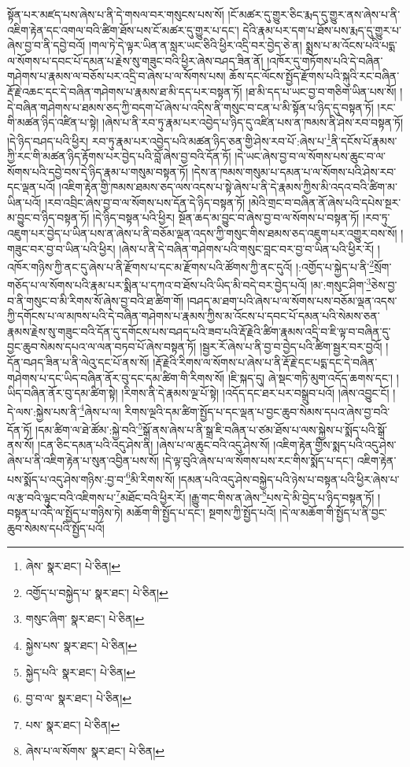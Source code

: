 སྟོན་པར་མཛད་པས་ཞེས་པ་ནི་དེ་གསལ་བར་གསུངས་པས་སོ། །ངོ་མཚར་དུ་གྱུར་ཅིང་རྨད་དུ་གྱུར་ནས་ཞེས་པ་ནི་འཇིག་རྟེན་དང་འགལ་བའི་ཚིག་ཐོས་པས་ངོ་མཚར་དུ་གྱུར་པ་དང་། དེའི་རྣམ་པར་དག་པ་ཐོས་པས་རྨད་དུ་གྱུར་པ་ཞེས་བྱ་བ་ནི་དབྱེ་བའོ། །གལ་ཏེ་དེ་ལྟར་ཡིན་ན་སླར་ཡང་ཅིའི་ཕྱིར་འདྲི་བར་བྱེད་ཅེ་ན། སྨྲས་པ་མ་འོངས་པའི་པདྨ་ལ་སོགས་པ་དབང་པོ་དམན་པ་རྗེས་སུ་གཟུང་བའི་ཕྱིར་ཞེས་བཤད་ཟིན་ནོ། །འཁོར་དུ་གཏོགས་པའི་དེ་བཞིན་གཤེགས་པ་རྣམས་ལ་བཅོས་པར་འདྲི་བ་ཞེས་པ་ལ་སོགས་པས། ཆོས་དང་ལོངས་སྤྱོད་རྫོགས་པའི་སྐུའི་རང་བཞིན་རྡོ་རྗེ་འཆང་དང་དེ་བཞིན་གཤེགས་པ་རྣམས་ཐ་མི་དད་པར་བསྟན་ཏོ། །ཐ་མི་དད་པ་ཡང་བྱ་བ་གཅིག་ཡིན་པས་སོ། །དེ་བཞིན་གཤེགས་པ་ཐམས་ཅད་ཀྱི་བདག་པོ་ཞེས་པ་འདིས་ནི་གསུང་བ་ངན་པ་མི་སྟོན་པ་ཉིད་དུ་བསྟན་ཏོ། །རང་གི་མཚན་ཉིད་འཛིན་པ་སྟེ། །ཞེས་པ་ནི་རབ་ཏུ་རྣམ་པར་འབྱེད་པ་ཉིད་དུ་འཛིན་པས་ན་ཁམས་ནི་ཤེས་རབ་བསྟན་ཏོ། །དེ་ཉིད་བཤད་པའི་ཕྱིར། རབ་ཏུ་རྣམ་པར་འབྱེད་པའི་མཚན་ཉིད་ཅན་གྱི་ཤེས་རབ་པོ་:ཞེས་པ་\footnote{ཞེས་  སྣར་ཐང་།  པེ་ཅིན། }ནི་དངོས་པོ་རྣམས་ཀྱི་རང་གི་མཚན་ཉིད་རྟོགས་པར་བྱེད་པའི་བློ་ཞེས་བྱ་བའི་དོན་ཏོ། །དེ་ཡང་ཞེས་བྱ་བ་ལ་སོགས་པས་ཆུང་བ་ལ་སོགས་པའི་དབྱེ་བས་དེ་ཉིད་རྣམ་པ་གསུམ་བསྟན་ཏོ། །དེས་ན་ཁམས་གསུམ་པ་དམན་པ་ལ་སོགས་པའི་ཤེས་རབ་དང་ལྡན་པའོ། །འཇིག་རྟེན་གྱི་ཁམས་ཐམས་ཅད་ལས་འདས་པ་སྟེ་ཞེས་པ་ནི་དེ་རྣམས་ཀྱིས་མི་འདའ་བའི་ཚིག་མ་ཡིན་པའོ། །རབ་འབྲིང་ཞེས་བྱ་བ་ལ་སོགས་པས་དོན་དེ་ཉིད་བསྟན་ཏོ། །མེའི་གྲང་བ་བཞིན་ནོ་ཞེས་པའི་དཔེས་སྔར་མ་བྱུང་བ་ཉིད་བསྟན་ཏོ། །དེ་ཉིད་བསྟན་པའི་ཕྱིར། སྔོན་ཆད་མ་བྱུང་བ་ཞེས་བྱ་བ་ལ་སོགས་པ་བསྟན་ཏོ། །རབ་ཏུ་འཇུག་པར་བྱེད་པ་ཡིན་པས་ན་ཞེས་པ་ནི་བཅོམ་ལྡན་འདས་ཀྱི་གསུང་གིས་ཐམས་ཅད་འཇུག་པར་འགྱུར་བས་སོ། །གཟུང་བར་བྱ་བ་ཡིན་པའི་ཕྱིར། །ཞེས་པ་ནི་དེ་བཞིན་གཤེགས་པའི་གསུང་བླང་བར་བྱ་བ་ཡིན་པའི་ཕྱིར་རོ། །འཁོར་གཉིས་ཀྱི་ནང་དུ་ཞེས་པ་ནི་རྫོགས་པ་དང་མ་རྫོགས་པའི་ཚོགས་ཀྱི་ནང་དུའོ། །:འགྱོད་པ་སྐྱེད་པ་ནི་\footnote{འགྱོད་པ་བསྐྱེད་པ་  སྣར་ཐང་།  པེ་ཅིན། }སྲོག་གཅོད་པ་ལ་སོགས་པའི་རྣམ་པར་སྨིན་པ་དཀའ་བ་ཐོས་པའི་ཡིད་མི་བདེ་བར་བྱེད་པའོ། །མ་:གསུང་ཤིག་\footnote{གསུང་ཞིག་  སྣར་ཐང་།  པེ་ཅིན། }ཅེས་བྱ་བ་ནི་གསུང་བ་མི་རིགས་སོ་ཞེས་བྱ་བའི་ཐ་ཚིག་གོ། །བཤད་མ་ཐག་པའི་ཞེས་པ་ལ་སོགས་པས་བཅོམ་ལྡན་འདས་ཀྱི་དགོངས་པ་ལ་མཁས་པའི་དེ་བཞིན་གཤེགས་པ་རྣམས་ཀྱིས་མ་འོངས་པ་དབང་པོ་དམན་པའི་སེམས་ཅན་རྣམས་རྗེས་སུ་གཟུང་བའི་དོན་དུ་དགོངས་པས་བཤད་པའི་ཟབ་པའི་རྡོ་རྗེའི་ཚིག་རྣམས་འདྲི་བ་ཇི་ལྟ་བ་བཞིན་དུ་བྱང་ཆུབ་སེམས་དཔའ་ལ་ལན་བཏབ་པོ་ཞེས་བསྟན་ཏོ། །སྦྱར་རོ་ཞེས་པ་ནི་བྱ་བ་བྱེད་པའི་ཚིག་སྦྱར་བར་བྱའོ། །དོན་བཤད་ཟིན་པ་ནི་ལེའུ་དང་པོ་ནས་སོ། །རྡོ་རྗེའི་རིགས་ལ་སོགས་པ་ཞེས་པ་ནི་རྡོ་རྗེ་དང་པདྨ་དང་དེ་བཞིན་གཤེགས་པ་དང་ཡིད་བཞིན་ནོར་བུ་དང་དམ་ཚིག་གི་རིགས་སོ། །ཇི་སྐད་དུ། ཞེ་སྡང་གཏི་མུག་འདོད་ཆགས་དང་། །ཡིད་བཞིན་ནོར་བུ་དམ་ཚིག་སྟེ། །རིགས་ནི་དེ་རྣམས་ལྔ་པོ་སྟེ། །འདོད་དང་ཐར་པར་བསྒྲུབ་པའོ། །ཞེས་འབྱུང་ངོ། །དེ་ལས་:སྐྱེས་པས་ནི་\footnote{སྐྱེས་པས་  སྣར་ཐང་།  པེ་ཅིན། }ཞེས་པ་ལ། རིགས་ལྔའི་དམ་ཚིག་སྤྱོད་པ་དང་ལྡན་པ་བྱང་ཆུབ་སེམས་དཔའ་ཞེས་བྱ་བའི་དོན་ཏོ། །དམ་ཚིག་ལ་ཐེ་ཚོམ་:སྐྱེ་བའི་\footnote{སྐྱེད་པའི་  སྣར་ཐང་།  པེ་ཅིན། }སྒོ་ནས་ཞེས་པ་ནི་སྒྲ་ཇི་བཞིན་པ་ཙམ་ཐོས་པ་ལས་སྐྱེས་པ་སྨོད་པའི་སྒོ་ནས་སོ། །ངན་ཅིང་དམན་པའི་འདུ་ཤེས་ནི། །ཞེས་པ་ལ་ཆུང་བའི་འདུ་ཤེས་སོ། །འཇིག་རྟེན་གྱིས་སྨད་པའི་འདུ་ཤེས་ཞེས་པ་ནི་འཇིག་རྟེན་པ་སུན་འབྱིན་པས་སོ། །དེ་ལྟ་བུའི་ཞེས་པ་ལ་སོགས་པས་རང་གིས་སྨོད་པ་དང་། འཇིག་རྟེན་པས་སྨོད་པ་འདུ་ཤེས་གཉིས་:བྱ་བ་\footnote{བྱ་བ་ལ་  སྣར་ཐང་།  པེ་ཅིན། }མི་རིགས་སོ། །དམན་པའི་འདུ་ཤེས་བསྐྱེད་པའི་ཉེས་པ་བསྟན་པའི་ཕྱིར་ཞེས་པ་ལ་རྩ་བའི་ལྟུང་བའི་འཇིགས་པ་\footnote{པས་  སྣར་ཐང་།  པེ་ཅིན། }མཐོང་བའི་ཕྱིར་རོ། །རྒྱུ་གང་གིས་ན་ཞེས་\footnote{ཞེས་པ་ལ་སོགས་  སྣར་ཐང་།  པེ་ཅིན། }པས་དེ་མི་བྱེད་པ་ཉིད་བསྟན་ཏོ། །བསྟན་པ་འདི་ལ་སྤྱོད་པ་གཉིས་ཏེ། མཆོག་གི་སྤྱོད་པ་དང་། སྔགས་ཀྱི་སྤྱོད་པའོ། །དེ་ལ་མཆོག་གི་སྤྱོད་པ་ནི་བྱང་ཆུབ་སེམས་དཔའི་སྤྱོད་པའོ། 